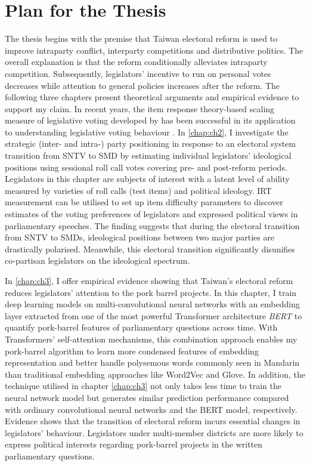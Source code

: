 \section*{\centering Plan for the Thesis}
The thesis begins with the premise that Taiwan electoral reform is used to improve intraparty conflict, interparty competitions and distributive politics. The overall explanation is that the reform conditionally alleviates intraparty competition. Subsequently, legislators' incentive to run on personal votes decreases while attention to general policies increases after the reform. The following three chapters present theoretical arguments and empirical evidence to support my claim. In recent years, the item response theory-based scaling measure of legislative voting developed by \citet{Clinton2004} has been successful in its application to understanding legislative voting behaviour \citep[e.g.][]{Zucco2011, Tsai2020, Gray2019}. In \autoref{chap:ch2}, I 
investigate the strategic (inter- and intra-) party positioning in response to an electoral system transition from SNTV to SMD by estimating individual legislators' ideological positions using sessional roll call votes covering pre- and post-reform periods. Legislators in this chapter are subjects of interest with a latent level of ability measured by varieties of roll calls  (test items) and political ideology. IRT measurement can be utilised to set up item difficulty parameters to discover estimates of the voting preferences of legislators and expressed political views in parliamentary speeches. The finding suggests that during the electoral transition from SNTV to SMDs, ideological positions between two major parties are drastically polarised. Meanwhile, this electoral transition significantly disunifies co-partisan legislators on the ideological spectrum. 

In \autoref{chap:ch3}, I offer empirical evidence showing that Taiwan's electoral reform reduces legislators' attention to the pork barrel projects. In this chapter, I train deep learning models on multi-convolutional neural networks with an embedding layer extracted from one of the most powerful Transformer architecture \textit{BERT} to quantify pork-barrel features of parliamentary questions across time. With Transformers' self-attention mechanisms, this combination approach enables my pork-barrel algorithm to learn more condensed features of embedding representation and better handle polysemous words commonly seen in Mandarin than traditional embedding approaches like Word2Vec and Glove. In addition, the technique utilised in chapter \autoref{chap:ch3} not only takes less time to train the neural network model but generates similar prediction performance compared with ordinary convolutional neural networks and the BERT model, respectively. Evidence shows that the transition of electoral reform incurs essential changes in legislators' behaviour. Legislators under multi-member districts are more likely to express political interests regarding pork-barrel projects in the written parliamentary questions. 

